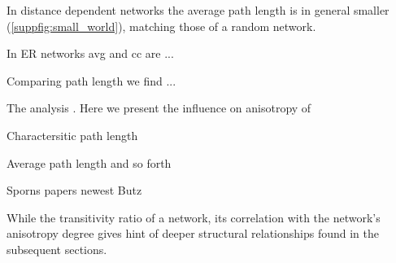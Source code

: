 In distance dependent networks the average path length is in general
smaller (\autoref{suppfig:small_world}), matching those of a random network.


In ER networks avg and cc are ...


Comparing path length we find ... 

The analysis . Here we present the influence on anisotropy of

Charactersitic path length



Average path length and so forth

Sporns papers   newest Butz

While the transitivity ratio of a network, its correlation with the
network's anisotropy degree gives hint of deeper structural
relationships found in the subsequent sections.



